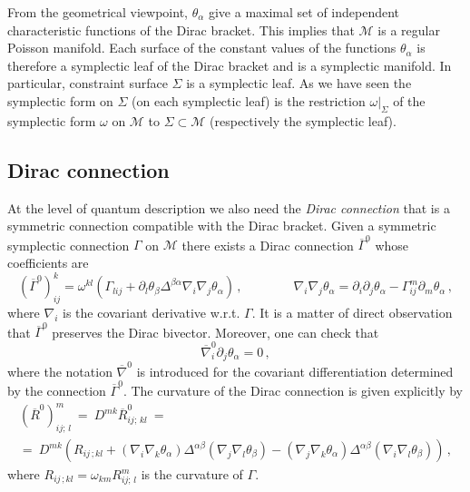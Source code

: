\documentclass[a4paper,11pt]{amsart}
\numberwithin{thm}{section} %
\numberwithin{equation}{section} %
\numberwithin{figure}{section} %
\renewcommand{\:}{{\rm\, :\,}}
\def\bar{\overline}
\def\d{\partial}
\def\manM{{\mathcal M}}
\def\con{{\bar\Gamma}}
\def\Dcon-d{{\bar\nabla}^0}
\begin{document}
From the geometrical viewpoint, $\theta_\alpha$ give a
maximal set of independent characteristic functions of the Dirac
bracket.  This implies that $\manM$ is a regular Poisson manifold.
Each surface of the constant values of the functions
$\theta_\alpha$ is therefore a symplectic leaf of the Dirac bracket
and is a symplectic manifold. In particular, constraint surface
$\Sigma$ is a symplectic leaf.  As we have seen the symplectic form on
$\Sigma$ (on each symplectic leaf) is the restriction
$\omega|_{\Sigma}$ of the symplectic form $\omega$ on $\manM$ to
$\Sigma \subset \manM$ (respectively the symplectic leaf).

\subsection{Dirac connection}\label{subsec:D-connection}
At the level of quantum description we also need the
\textit{Dirac connection} that is a symmetric
connection compatible with the Dirac bracket.  Given a symmetric
symplectic connection $\Gamma$ on $\manM$ there exists a Dirac
connection $\con^0$ whose coefficients are
\begin{equation}
\label{eq:Dirac-con}
{(\con^0)}^k_{ij}=\omega^{kl}
(\Gamma_{lij}+ \d_l \theta_\beta \Delta^{\beta \alpha} \nabla_i \nabla_j \theta_\alpha
)\,,\qquad \qquad \nabla_i \nabla_j \theta_\alpha= \d_i\d_j
\theta_\alpha-\Gamma^m_{ij}\d_m \theta_\alpha\,,
\end{equation}
where $\nabla_i$ is the covariant derivative w.r.t. $\Gamma$.  It is
a matter of direct observation that $\con^0$ preserves the Dirac
bivector. Moreover, one can check that
\begin{equation}
\Dcon-d_i \d_j \theta_\alpha=0\,,
\end{equation}
where the notation $\Dcon-d$ is introduced for the covariant
differentiation determined by the connection $\con^0$. The curvature
of the Dirac connection is given explicitly by
\begin{multline}
    ({\bar R}^0)^m_{ij;\,l}~=~D^{mk}{\bar R}^0_{ij;\,kl}~=\\
=~D^{mk}\left(R_{ij\,;kl}+
(\nabla_{i}\nabla_{k}\theta_\alpha)
\Delta^{\alpha\beta}
(\nabla_{j}\nabla_{l}\theta_\beta)-
(\nabla_{j}\nabla_{k}\theta_\alpha)
\Delta^{\alpha\beta}
(\nabla_{i}\nabla_{l}\theta_\beta)\right)\,,
\end{multline}
where $R_{ij\,;kl}=\omega_{km}R^m_{ij;\,l}$ is the curvature of
$\Gamma$.
\end{document}
